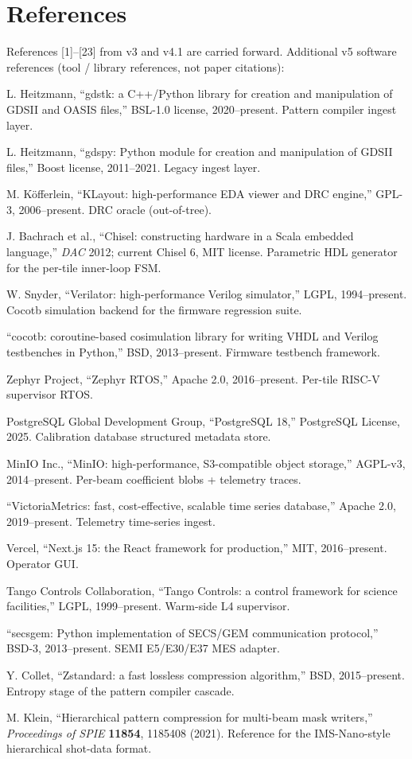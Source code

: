 \documentclass[11pt,letterpaper]{article}
\begin{document}
\section*{References}

References [1]--[23] from v3 and v4.1 are carried forward. Additional v5 software references (tool / library references, not paper citations):

\begin{enumerate}[leftmargin=2.2em,label={[\arabic*]},start=24]
\item L. Heitzmann, ``gdstk: a C++/Python library for creation and manipulation of GDSII and OASIS files,'' BSL-1.0 license, 2020--present. Pattern compiler ingest layer.
\item L. Heitzmann, ``gdspy: Python module for creation and manipulation of GDSII files,'' Boost license, 2011--2021. Legacy ingest layer.
\item M. K\"offerlein, ``KLayout: high-performance EDA viewer and DRC engine,'' GPL-3, 2006--present. DRC oracle (out-of-tree).
\item J. Bachrach et al., ``Chisel: constructing hardware in a Scala embedded language,'' \textit{DAC} 2012; current Chisel 6, MIT license. Parametric HDL generator for the per-tile inner-loop FSM.
\item W. Snyder, ``Verilator: high-performance Verilog simulator,'' LGPL, 1994--present. Cocotb simulation backend for the firmware regression suite.
\item ``cocotb: coroutine-based cosimulation library for writing VHDL and Verilog testbenches in Python,'' BSD, 2013--present. Firmware testbench framework.
\item Zephyr Project, ``Zephyr RTOS,'' Apache 2.0, 2016--present. Per-tile RISC-V supervisor RTOS.
\item PostgreSQL Global Development Group, ``PostgreSQL 18,'' PostgreSQL License, 2025. Calibration database structured metadata store.
\item MinIO Inc., ``MinIO: high-performance, S3-compatible object storage,'' AGPL-v3, 2014--present. Per-beam coefficient blobs + telemetry traces.
\item ``VictoriaMetrics: fast, cost-effective, scalable time series database,'' Apache 2.0, 2019--present. Telemetry time-series ingest.
\item Vercel, ``Next.js 15: the React framework for production,'' MIT, 2016--present. Operator GUI.
\item Tango Controls Collaboration, ``Tango Controls: a control framework for science facilities,'' LGPL, 1999--present. Warm-side L4 supervisor.
\item ``secsgem: Python implementation of SECS/GEM communication protocol,'' BSD-3, 2013--present. SEMI E5/E30/E37 MES adapter.
\item Y. Collet, ``Zstandard: a fast lossless compression algorithm,'' BSD, 2015--present. Entropy stage of the pattern compiler cascade.
\item M. Klein, ``Hierarchical pattern compression for multi-beam mask writers,'' \textit{Proceedings of SPIE} \textbf{11854}, 1185408 (2021). Reference for the IMS-Nano-style hierarchical shot-data format.
\end{enumerate}
\end{document}

